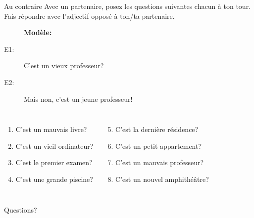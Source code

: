 \documentclass{beamer}
\begin{document}
  \begin{frame}{Au contraire}
    Avec un partenaire, posez les questions suivantes chacun à ton tour.
    Fais répondre avec l'adjectif opposé à ton/ta partenaire. \\
    \begin{center}
      \begin{description}
        \item[] \textbf{Modèle:}
        \item[E1:] C'est un vieux professeur?
        \item[E2:] Mais non, c'est un jeune professeur!
      \end{description}
      \begin{columns}
          \begin{enumerate}
            \item C'est un mauvais livre?
            \item C'est un vieil ordinateur?
            \item C'est le premier examen?
            \item C'est une grande piscine?
          \end{enumerate}
          \begin{enumerate}
            \setcounter{enumi}{4}
            \item C'est la dernière résidence?
            \item C'est un petit appartement?
            \item C'est un mauvais professeur?
            \item C'est un nouvel amphithéâtre?
          \end{enumerate}
      \end{columns}
    \end{center}
  \end{frame}

  \begin{frame}{}
    \begin{center}
      \Large Questions?
    \end{center}
  \end{frame}
\end{document}
